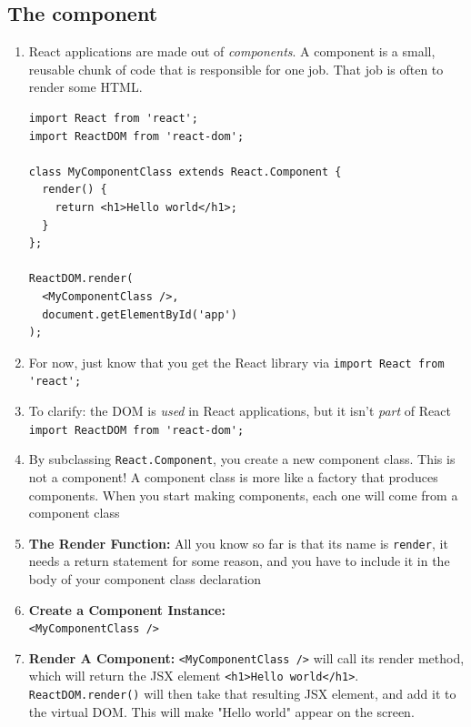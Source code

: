 \documentclass[a4paper, 12pt]{article}
\begin{document}
\subsection{The component}
\begin{enumerate}
\item React applications are made out of \textit{components}. A component is a small, reusable chunk of code that is responsible for one job. That job is often to render some HTML.
\begin{verbatim}
import React from 'react';
import ReactDOM from 'react-dom';

class MyComponentClass extends React.Component {
  render() {
    return <h1>Hello world</h1>;
  }
};

ReactDOM.render(
  <MyComponentClass />,
  document.getElementById('app')
);
\end{verbatim}

\item For now, just know that you get the React library via \verb|import React from 'react';|

\item To clarify: the DOM is \textit{used} in React applications, but it isn't \textit{part} of React\\
\verb|import ReactDOM from 'react-dom';|

\item By subclassing \verb|React.Component|, you create a new component class. This is not a component! A component class is more like a factory that produces components. When you start making components, each one will come from a component class

\item \textbf{The Render Function:} All you know so far is that its name is \verb|render|, it needs a return statement for some reason, and you have to include it in the body of your component class declaration

\item \textbf{Create a Component Instance: }\\\verb|<MyComponentClass />|

\item \textbf{Render A Component: }
\verb|<MyComponentClass />| will call its render method, which will return the JSX element \verb|<h1>Hello world</h1>|. \verb|ReactDOM.render()| will then take that resulting JSX element, and add it to the virtual DOM. This will make "Hello world" appear on the screen.

\end{enumerate}
\end{document}
